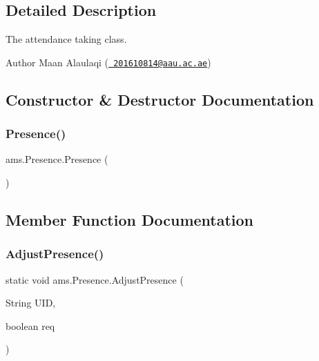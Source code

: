 \subsection{Detailed Description}
The attendance taking class.

\begin{DoxyAuthor}{Author}
Maan Alaulaqi (\href{mailto:201610814@aau.ac.ae}{\texttt{ 201610814@aau.\+ac.\+ae}}) 
\end{DoxyAuthor}


\subsection{Constructor \& Destructor Documentation}
\mbox{\label{classams_1_1_presence_a88d6cd256a57c95640b53a5bd221fac7}} 
\subsubsection{\texorpdfstring{Presence()}{Presence()}}
{\footnotesize\ttfamily ams.\+Presence.\+Presence (\begin{DoxyParamCaption}{ }\end{DoxyParamCaption})}



\subsection{Member Function Documentation}
\mbox{\label{classams_1_1_presence_aa72c8cdcdfbec64c43fa32b469b9e822}} 
\subsubsection{\texorpdfstring{AdjustPresence()}{AdjustPresence()}}
{\footnotesize\ttfamily static void ams.\+Presence.\+Adjust\+Presence (\begin{DoxyParamCaption}\item[{String}]{U\+ID,  }\item[{boolean}]{req }\end{DoxyParamCaption})\hspace{0.3cm}{\ttfamily [static]}}

